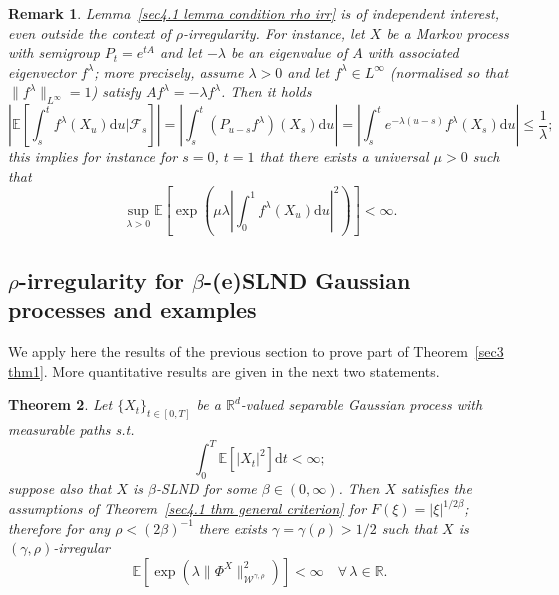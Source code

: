 \documentclass[10pt]{article}
\newcommand{\mathd}{\mathrm{d}}
\newtheorem{theorem}{Theorem}%
\newtheorem{remark}[theorem]{Remark}
\begin{document}
\begin{remark}
  Lemma~\ref{sec4.1 lemma condition rho irr} is of independent interest, even
  outside the context of $\rho$\mbox{-}irregularity. For instance, let $X$ be
  a Markov process with semigroup $P_t = e^{t A}$ and let $- \lambda$ be an
  eigenvalue of $A$ with associated eigenvector $f^{\lambda}$; more precisely,
  assume $\lambda > 0$ and let $f^{\lambda} \in L^{\infty}$ (normalised so
  that $\| f^{\lambda} \|_{L^{\infty}} = 1$) satisfy $A f^{\lambda} = -
  \lambda f^{\lambda}$. Then it holds
  \[ \left| \mathbb{E} \left[ \int_s^t f^{\lambda} (X_u) \mathd u |
     \mathcal{F}_s \right] \right| = \left| \int_s^t (P_{u - s} f^{\lambda})
     (X_s) \mathd u \right| = \left| \int_s^t e^{- \lambda (u - s)}
     f^{\lambda} (X_s) \mathd u \right| \leqslant \frac{1}{\lambda} ; \]
  this implies for instance for $s = 0$, $t = 1$ that there exists a universal
  $\mu > 0$ such that
  \[ \sup_{\lambda > 0} \mathbb{E} \left[ \exp \left( \mu \lambda \left|
     \int_0^1 f^{\lambda} (X_u) \mathd u \right|^2 \right) \right] < \infty .
  \]
\end{remark}

\subsection{$\rho$\mbox{-}irregularity for $\beta$\mbox{-}(e)SLND Gaussian
processes and examples}\label{sec4.2}

We apply here the results of the previous section to prove part of
Theorem~\ref{sec3 thm1}. More quantitative results are given in the next two
statements.

\begin{theorem}
  \label{sec4.2 corollary rho gaussian}Let $\{ X_t \}_{t\in [0,T]}$ be a
  $\mathbb{R}^d$-valued separable Gaussian process with measurable paths s.t.
  \begin{equation}
    \int_0^T \mathbb{E} [| X_t |^2] \mathd t < \infty ; \label{sec4.2 gaussian
    integrability condition}
  \end{equation}
  suppose also that $X$ is $\beta$\mbox{-}SLND for some $\beta\in (0,\infty)$. Then $X$ satisfies the
  assumptions of Theorem~\ref{sec4.1 thm general criterion} for $F (\xi) = |
  \xi |^{1 / 2 \beta}$; therefore for any $\rho < (2 \beta)^{- 1}$ there
  exists $\gamma = \gamma (\rho) > 1 / 2$ such that $X$ is $(\gamma,
  \rho)$-irregular
  \[ \mathbb{E} [\exp (\lambda \| \Phi^X \|_{\mathcal{W}^{\gamma, \rho}}^2)] <
     \infty \quad \forall \, \lambda \in \mathbb{R}. \]
\end{theorem}
\end{document}
